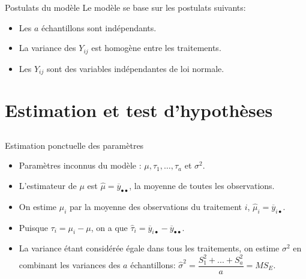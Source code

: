 \documentclass{BeamerTemplate}
\begin{document}
\begin{frame}[t]{Postulats du modèle}
Le modèle se base sur les postulats suivants:

\begin{itemize}
\item[(P1)] Les $a$ échantillons sont indépendants.
\item[(P2)] La variance des $Y_{ij}$ est homogène entre les traitements.
\item[(P3)] Les $Y_{ij}$ sont des variables indépendantes de loi normale.
\end{itemize}

\medskip
{}
\end{frame}


\section[Inférence globale]{Estimation et test d'hypothèses}\label{sec:infe1fac}
\subsection*{ }

\begin{frame}[t]{Estimation ponctuelle des paramètres}

{\small
\begin{itemize}
\item<1-> Paramètres inconnus du modèle : $\mu,\tau_1,\ldots,\tau_a$ et $\sigma^2$.
\item<2-> L'estimateur de $\mu$ est \alert{$\hat{\mu}=\overline{y}_{\bullet\bullet}$}, la moyenne de toutes les observations.
\item<3-> On estime $\mu_i$ par la moyenne des observations du traitement $i$, \alert{$\hat{\mu}_i=\overline{y}_{i\bullet}$}.
\item<4-> Puisque $\tau_i=\mu_i-\mu$, on a que \alert{$\hat{\tau}_i=\overline{y}_{i\bullet}-\overline{y}_{\bullet\bullet}$}.
\item<5-> La variance étant considérée égale dans tous les traitements, on estime $\sigma^2$ en combinant les variances des $a$ échantillons: \alert{$\hat{\sigma}^2=\dfrac{S_1^2+...+S_a^2}{a}=MS_E$}.
\end{itemize}
}

\end{frame}
\end{document}
